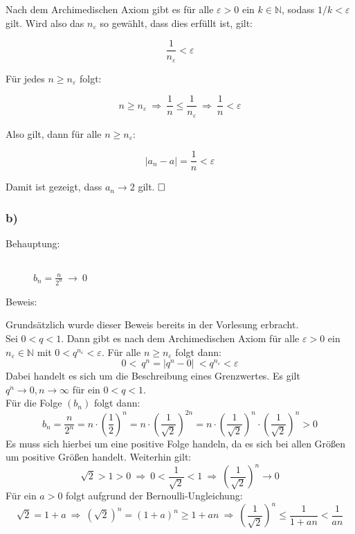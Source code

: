 \documentclass[10pt, a4paper]{article}
\begin{document}
			Nach dem Archimedischen Axiom gibt es für alle $\varepsilon > 0$ ein $k \in \mathbb{N}$, sodass $1/k < \varepsilon$ gilt. Wird also das $n_{\varepsilon}$ so gewählt, dass dies erfüllt ist, gilt:

			\[
				\dfrac{1}{n_{\varepsilon}} < \varepsilon 
			\]

			Für jedes $n \geq n_{\varepsilon}$ folgt:

			\[
				n \geq n_{\varepsilon} \ \Rightarrow \  \dfrac{1}{n} \leq \dfrac{1}{n_{\varepsilon}}  \ \Rightarrow \ \dfrac{1}{n} < \varepsilon 
			\]

			Also gilt, dann für alle $n \geq n_{\varepsilon}$:

			\[
				|a_n-a| = \dfrac{1}{n} < \varepsilon
			\]

			Damit ist gezeigt, dass $a_n \longrightarrow 2$ gilt. $\hfill\Box$


		\subsubsection*{b)} %
		\label{ssub:b_}
		
			\begin{description}
				\item[Behauptung:] \hfill \\
					$b_n = \frac{n}{2^n} \ \longrightarrow \ 0$
				\item[Beweis:]
			\end{description}
			
			Grundsätzlich wurde dieser Beweis bereits in der Vorlesung erbracht.\\
			Sei $0 < q < 1$. Dann gibt es nach dem Archimedischen Axiom für alle $\varepsilon > 0$ ein $n_{\varepsilon} \in \mathbb{N}$ mit $0 < q^{n_{\varepsilon}} < \varepsilon$. Für alle $n \geq n_{\varepsilon}$ folgt dann:
			\[
				0 < \ q^n = \left|q^n-0\right| \ < q^{n_{\varepsilon}} < \varepsilon
			\]
			Dabei handelt es sich um die Beschreibung eines Grenzwertes. Es gilt $q^n \longrightarrow 0, n\longrightarrow \infty$ für ein $0 < q < 1$.\\

			Für die Folge $(b_n)$ folgt dann:
			\[
				b_n = \frac{n}{2^n} = n\cdot \left(\dfrac{1}{2}\right)^n = n \cdot \left( \dfrac{1}{\sqrt{2}} \right)^{2n} = n \cdot \left( \dfrac{1}{\sqrt{2}} \right)^{n} \cdot \left( \dfrac{1}{\sqrt{2}} \right)^{n} > 0
			\]
			Es muss sich hierbei um eine positive Folge handeln, da es sich bei allen Größen um positive Größen handelt.
			Weiterhin gilt:
			\[
				\sqrt{2}>1>0  \ \Rightarrow \  0 < \dfrac{1}{\sqrt{2}} < 1 \ \Rightarrow \ \left( \dfrac{1}{\sqrt{2}} \right)^{n} \longrightarrow 0
			\]
			Für ein $a > 0$ folgt aufgrund der Bernoulli-Ungleichung:
			\[
				\sqrt{2} = 1+a \ \Rightarrow \ \left( \sqrt{2} \right)^n = (1+a)^n \geq 1 + an  \ \Rightarrow \  \left(\dfrac{1}{\sqrt{2}}\right)^n \leq \dfrac{1}{1+an} < \dfrac{1}{an} 
			\]
\end{document}
